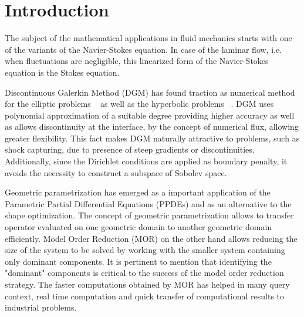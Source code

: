 \documentclass[graybox]{svmult}
\begin{document}

\section{Introduction}
\label{introduction}

The subject of the mathematical applications in fluid mechanics starts with one of the variants of the Navier-Stokes equation. In case of the laminar flow, i.e. when fluctuations are negligible, this linearized form of the Navier-Stokes equation is the Stokes equation.

Discontinuous Galerkin Method (DGM) has found traction as numerical method for the elliptic problems ~\cite{peraire} as well as the hyperbolic problems ~\cite{hyperbolic}. DGM uses polynomial approximation of a suitable degree providing higher accuracy as well as allows discontinuity at the interface, by the concept of numerical flux, allowing greater flexibility. This fact makes DGM naturally attractive to problems, such as shock capturing, due to presence of steep gradients or discontinuities. Additionally, since the Dirichlet conditions are applied as boundary penalty, it avoids the necessity to construct a subspace of Sobolev space.

Geometric parametrization has emerged as a important application of the Parametric Partial Differential Equations (PPDEs) and as an alternative to the shape optimization. The concept of geometric parametrization allows to transfer operator evaluated on one geometric domain to another geometric domain efficiently. Model Order Reduction (MOR) on the other hand allows reducing the size of the system to be solved by working with the smaller system containing only dominant components. It is pertinent to mention that identifying the "dominant" components is critical to the success of the model order reduction strategy. The  faster computations obtained by MOR has helped in many query context, real time computation and quick transfer of computational results to industrial problems.
\end{document}
